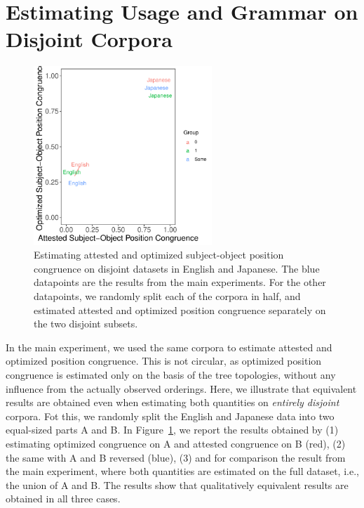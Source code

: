 \documentclass[11pt,a4paper]{article}
\newcommand\mhahn[1]{{\color{red}(#1)}}
\begin{document}

\section{Estimating Usage and Grammar on Disjoint Corpora}


\begin{figure}
	\begin{center}
\includegraphics[width=0.6\textwidth]{../disjoint/plane-disjoint.pdf}
	\end{center}
	\caption{Estimating attested and optimized subject-object position congruence on disjoint datasets in English and Japanese. The blue datapoints are the results from the main experiments. For the other datapoints, we randomly split each of the corpora in half, and estimated attested and optimized position congruence separately on the two disjoint subsets.}\label{fig:disjoint}
\end{figure}

In the main experiment, we used the same corpora to estimate attested and optimized position congruence.
This is not circular, as optimized position congruence is estimated only on the basis of the tree topologies, without any influence from the actually observed orderings.
Here, we illustrate that equivalent results are obtained even when estimating both quantities on \emph{entirely disjoint} corpora.
Fot this, we randomly split the English and Japanese data into two equal-sized parts A and B.
In Figure~\ref{fig:disjoint}, we report the results obtained by (1) estimating optimized congruence on A and attested congruence on B (red), (2) the same with A and B reversed (blue), (3) and for comparison the result from the main experiment, where both quantities are estimated on the full dataset, i.e., the union of A and B.
The results show that qualitatively equivalent results are obtained in all three cases.





\end{document}
